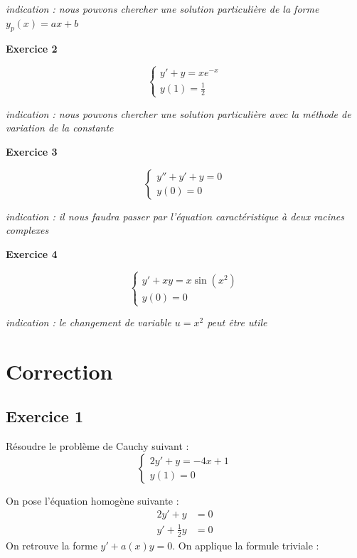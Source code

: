 \documentclass{article}
\newcommand{\exo}[1]{
    \vspace{5mm}
    \textbf{Exercice #1}
    \hrulefill
}
\begin{document}
\scriptsize
\textit{indication : nous pouvons chercher une solution particulière de la forme $y_p(x) = ax+b$}
\normalsize


\exo{2}

\begin{equation*}
\begin{cases}
y' + y = xe^{-x}\\
y(1)=\frac{1}{2}
\end{cases}
\end{equation*}

\scriptsize
\textit{indication : nous pouvons chercher une solution particulière avec la méthode de variation de la constante}
\normalsize


\exo{3}

\begin{equation*}
\begin{cases}
    y'' + y' + y = 0  \\
    y(0)=0
\end{cases}
\end{equation*}

\scriptsize
\textit{indication : il nous faudra passer par l'équation caractéristique à deux racines complexes}
\normalsize

\exo{4}

\begin{equation*}
\begin{cases}
    y' + xy = x\sin(x^2) \\
    y(0)=0
\end{cases}
\end{equation*}

\scriptsize
\textit{indication : le changement de variable $u = x^2$ peut être utile}
\normalsize

\section{Correction}
\subsection{Exercice 1}
Résoudre le problème de Cauchy suivant :
\begin{equation*}
\begin{cases}
2y' + y = -4x+1\\
y(1)=0 
\end{cases}
\end{equation*}

On pose l'équation homogène suivante :
\begin{equation*}
\begin{aligned}
2y' + y &= 0 \\
y' + \frac{1}{2}y &= 0 
\end{aligned}
\end{equation*}
On retrouve la forme $y'+a(x)y = 0$. On applique la formule triviale :
\end{document}
